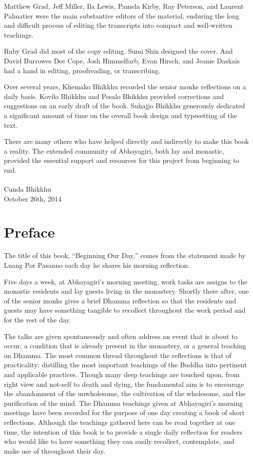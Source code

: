 \documentclass[11pt,openany]{memoir}
\begin{document}
Matthew Grad, Jeff Miller, Ila Lewis, Pamela Kirby, Ray Peterson, and
Laurent Palmatier were the main substantive editors of the material,
enduring the long and difficult process of editing the transcripts into
compact and well-written teachings.

Ruby Grad did most of the copy editing. Sumi Shin designed the cover.
And David Burrowes Dee Cope, Josh Himmelfarb, Evan Hirsch, and Jeanie
Daskais had a hand in editing, proofreading, or transcribing.

Over several years, Khemako Bhikkhu recorded the senior monks
reflections on a daily basis. Kovilo Bhikkhu and Pesalo Bhikkhu provided
corrections and suggestions on an early draft of the book. Suhajjo
Bhikkhu generously dedicated a significant amount of time on the overall
book design and typesetting of the text.

There are many others who have helped directly and indirectly to make
this book a reality. The extended community of Abhayagiri, both lay and
monastic, provided the essential support and resources for this project
from beginning to end.\\
\mbox{}\\
Cunda Bhikkhu\\
October 26th, 2014\nowidow[5]

\chapter{Preface}

The title of this book, ``Beginning Our Day,'' comes from the statement
made by Luang Por Pasanno each day he shares his morning reflection.

Five days a week, at Abhayagiri's morning meeting, work tasks are
assigns to the monastic residents and lay guests living in the
monastery. Shortly there after, one of the senior monks gives a brief
Dhamma reflection so that the residents and guests may have something
tangible to recollect throughout the work period and for the rest of the
day.

The talks are given spontaneously and often address an event that is
about to occur, a condition that is already present in the monastery, or
a general teaching on Dhamma. The most common thread throughout the
reflections is that of practicality: distilling the most important
teachings of the Buddha into pertinent and applicable practices. Though
many deep teachings are touched upon, from right view and not-self to
death and dying, the fundamental aim is to encourage the abandonment of
the unwholesome, the cultivation of the wholesome, and the purification
of the mind.
The Dhamma teachings given at Abhayagiri's morning meetings have been
recorded for the purpose of one day creating a book of short
reflections. Although the teachings gathered here can be read together
at one time, the intention of this book is to provide a single daily
reflection for readers who would like to have something they can easily
recollect, contemplate, and make use of throughout their day.
\end{document}
